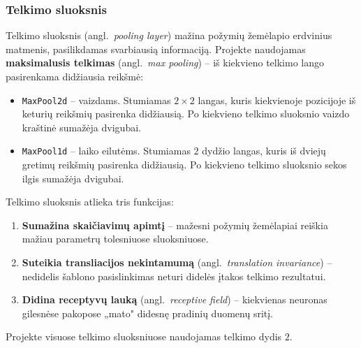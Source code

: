 \subsubsection{Telkimo sluoksnis}
\label{subsubsec:telkimo_sluoksnis}

Telkimo sluoksnis (angl.~\textit{pooling layer}) mažina požymių žemėlapio erdvinius matmenis, pasilikdamas svarbiausią informaciją. Projekte naudojamas \textbf{maksimalusis telkimas} (angl.~\textit{max pooling}) – iš kiekvieno telkimo lango pasirenkama didžiausia reikšmė:

\begin{itemize}
    \item \texttt{MaxPool2d} – vaizdams. Stumiamas $2 \times 2$ langas, kuris kiekvienoje pozicijoje iš keturių reikšmių pasirenka didžiausią. Po kiekvieno telkimo sluoksnio vaizdo kraštinė sumažėja dvigubai.
    \item \texttt{MaxPool1d} – laiko eilutėms. Stumiamas $2$ dydžio langas, kuris iš dviejų gretimų reikšmių pasirenka didžiausią. Po kiekvieno telkimo sluoksnio sekos ilgis sumažėja dvigubai.
\end{itemize}

Telkimo sluoksnis atlieka tris funkcijas:
\begin{enumerate}
    \item \textbf{Sumažina skaičiavimų apimtį} – mažesni požymių žemėlapiai reiškia mažiau parametrų tolesniuose sluoksniuose.
    \item \textbf{Suteikia transliacijos nekintamumą} (angl.~\textit{translation invariance}) – nedidelis šablono pasislinkimas neturi didelės įtakos telkimo rezultatui.
    \item \textbf{Didina receptyvų lauką} (angl.~\textit{receptive field}) – kiekvienas neuronas gilesnėse pakopose „mato" didesnę pradinių duomenų sritį.
\end{enumerate}

Projekte visuose telkimo sluoksniuose naudojamas telkimo dydis $2$.
